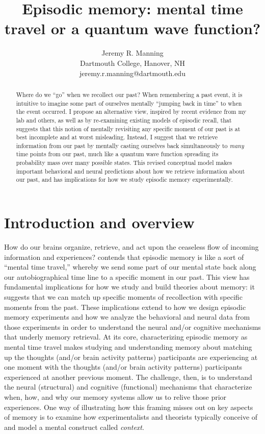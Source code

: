 \documentclass{article}
\title{Episodic memory: mental time travel or a quantum wave function?}
\author{Jeremy R. Manning\\Dartmouth College, Hanover, NH\\jeremy.r.manning@dartmouth.edu}
\begin{document}
\maketitle

\begin{abstract}
Where do we ``go'' when we recollect our past?  When remembering a past event, it is intuitive to imagine some part of ourselves mentally ``jumping back in time'' to when the event occurred. I propose an alternative view, inspired by recent evidence from my lab and others, as well as by re-examining existing models of episodic recall, that suggests that this notion of mentally revisiting any specific moment of our past is at best incomplete and at worst misleading.  Instead, I suggest that we retrieve information from our past by mentally casting ourselves back simultaneously to \textit{many} time points from our past, much like a quantum wave function spreading its probability mass over many possible states.  This revised conceptual model makes important behavioral and neural predictions about how we retrieve information about our past, and has implications for how we study episodic memory experimentally.
\end{abstract}

\section*{Introduction and overview}
How do our brains organize, retrieve, and act upon the ceaseless flow of incoming information and experiences?  \cite{Tulv83} contends that episodic memory is like a sort of ``mental time travel,'' whereby we send some part of our mental state back along our autobiographical time line to a specific moment in our past.  This view has fundamental implications for how we study and build theories about memory: it suggests that we can match up specific moments of recollection with specific moments from the past.  These implications extend to how we design episodic memory experiments and how we analyze the behavioral and neural data from those experiments in order to understand the neural and/or cognitive mechanisms that underly memory retrieval.  At its core, characterizing episodic memory as mental time travel makes studying and understanding memory about matching up the thoughts (and/or brain activity patterns) participants are experiencing at one moment with the thoughts (and/or brain activity patterns) participants experienced at another previous moment.  The challenge, then, is to understand the neural (structural) and cognitive (functional) mechanisms that characterize when, how, and why our memory systems allow us to relive those prior experiences.  One way of illustrating how this framing misses out on key aspects of memory is to examine how experimentalists and theorists typically conceive of and model a mental construct called \textit{context}.
\end{document}
